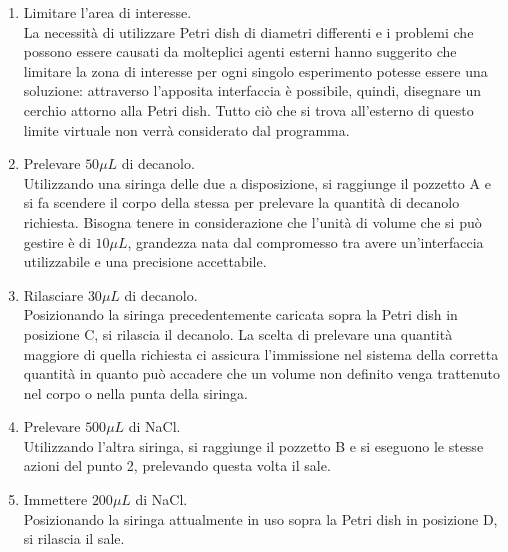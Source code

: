 \begin{enumerate}

	\item Limitare l'area di interesse.\\
		La necessità di utilizzare Petri dish di diametri differenti e i problemi che possono essere causati da molteplici agenti esterni hanno suggerito che limitare la zona di interesse per ogni singolo esperimento potesse essere una soluzione: attraverso l'apposita interfaccia è possibile, quindi, disegnare un cerchio attorno alla Petri dish. Tutto ciò che si trova all'esterno di questo limite virtuale non verrà considerato dal programma.

	\item Prelevare $50\mu L$ di decanolo.\\
		Utilizzando una siringa delle due a disposizione, si raggiunge il pozzetto A e si fa scendere il corpo della stessa per prelevare la quantità di decanolo richiesta. Bisogna tenere in considerazione che l'unità di volume che si può gestire è di $10\mu L$, grandezza nata dal compromesso tra avere un'interfaccia utilizzabile e una precisione accettabile. 

	\item Rilasciare $30\mu L$ di decanolo.\\
		 Posizionando la siringa precedentemente caricata sopra la Petri dish in posizione C, si rilascia il decanolo. 
La scelta di prelevare una quantità maggiore di quella richiesta ci assicura l'immissione nel sistema della corretta quantità in quanto può accadere che un volume non definito venga trattenuto nel corpo o nella punta della siringa.

	\item  Prelevare $500\mu L$ di NaCl. \\
		Utilizzando l'altra siringa, si raggiunge il pozzetto B e si eseguono le stesse azioni del punto 2, prelevando questa volta il sale. 
	
	\item Immettere $200\mu L$ di NaCl.\\
		Posizionando la siringa attualmente in uso sopra la Petri dish in posizione D, si rilascia il sale. 
\end{enumerate}

